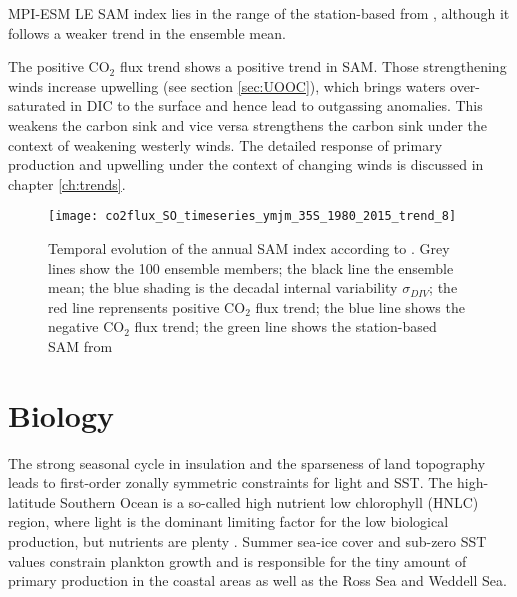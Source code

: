 \acs{MPI-ESM LE} \ac{SAM} index lies in the range of the station-based from \citep{Marshall2003}, although it follows a weaker trend in the ensemble mean.\newline

The positive CO$_2$ flux trend shows a positive trend in \acs{SAM}. Those strengthening winds increase upwelling (see section \ref{sec:UOOC}), which brings waters over-saturated in \acs{DIC} to the surface and hence lead to outgassing anomalies. This weakens the carbon sink and vice versa strengthens the carbon sink under the context of weakening westerly winds. The detailed response of primary production and upwelling under the context of changing winds is discussed in chapter \ref{ch:trends}.







\begin{figure}[h!]
	\texttt{[image: co2flux\_SO\_timeseries\_ymjm\_35S\_1980\_2015\_trend\_8]}
	\caption{Temporal evolution of the annual \ac{SAM} index according to \citep{Gong1999}. Grey lines show the 100 ensemble members; the black line the ensemble mean; the blue shading is the decadal internal variability $\sigma_{DIV}$; the red line reprensents positive CO$_2$ flux trend; the blue line shows the negative CO$_2$ flux trend; the green line shows the station-based \acs{SAM} from \cite{Marshall2003}}
	\label{fig:evolution_SAM}
\end{figure}






\clearpage
\section{Biology}
\label{sec:biology}

The strong seasonal cycle in insulation and the sparseness of land topography leads to first-order zonally symmetric constraints for light and \ac{SST}. The high-latitude Southern Ocean is a so-called high nutrient low chlorophyll (HNLC) region, where light is the dominant limiting factor for the low biological production, but nutrients are plenty \citep{Falkowski1998}. Summer sea-ice cover and sub-zero \acs{SST} values constrain plankton growth and is responsible for the tiny amount of primary production in the coastal areas as well as the Ross Sea and Weddell Sea. 

